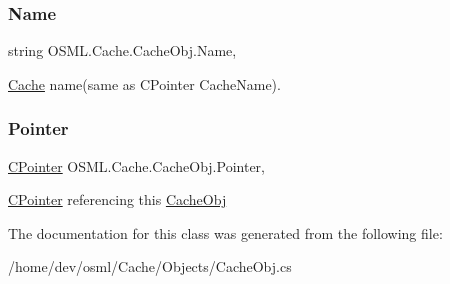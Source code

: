 \subsubsection{\texorpdfstring{Name}{Name}}
{\footnotesize\ttfamily string O\+S\+M\+L.\+Cache.\+Cache\+Obj.\+Name\hspace{0.3cm}{\ttfamily [get]}, {\ttfamily [set]}}



\mbox{\hyperlink{namespaceOSML_1_1Cache}{Cache}} name(same as C\+Pointer Cache\+Name). 

\mbox{\label{classOSML_1_1Cache_1_1CacheObj_a2dddda06275f188b9db7e813b87f2c96}} 
\subsubsection{\texorpdfstring{Pointer}{Pointer}}
{\footnotesize\ttfamily \mbox{\hyperlink{classOSML_1_1Cache_1_1CPointer}{C\+Pointer}} O\+S\+M\+L.\+Cache.\+Cache\+Obj.\+Pointer\hspace{0.3cm}{\ttfamily [get]}, {\ttfamily [set]}}



\mbox{\hyperlink{classOSML_1_1Cache_1_1CPointer}{C\+Pointer}} referencing this \mbox{\hyperlink{classOSML_1_1Cache_1_1CacheObj}{Cache\+Obj}} 



The documentation for this class was generated from the following file\+:\begin{DoxyCompactItemize}
\item 
/home/dev/osml/\+Cache/\+Objects/Cache\+Obj.\+cs\end{DoxyCompactItemize}
